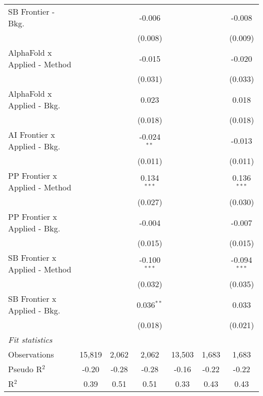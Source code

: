 \begin{tabular}{lcccccc}
   SB Frontier - Bkg.             &         &             & -0.006         &              &         & -0.008\\   
                                  &         &             & (0.008)        &              &         & (0.009)\\   
   AlphaFold x Applied - Method   &         &             & -0.015         &              &         & -0.020\\   
                                  &         &             & (0.031)        &              &         & (0.033)\\   
   AlphaFold x Applied - Bkg.     &         &             & 0.023          &              &         & 0.018\\   
                                  &         &             & (0.018)        &              &         & (0.018)\\   
   AI Frontier x Applied - Bkg.   &         &             & -0.024$^{**}$  &              &         & -0.013\\   
                                  &         &             & (0.011)        &              &         & (0.011)\\   
   PP Frontier x Applied - Method &         &             & 0.134$^{***}$  &              &         & 0.136$^{***}$\\   
                                  &         &             & (0.027)        &              &         & (0.030)\\   
   PP Frontier x Applied - Bkg.   &         &             & -0.004         &              &         & -0.007\\   
                                  &         &             & (0.015)        &              &         & (0.015)\\   
   SB Frontier x Applied - Method &         &             & -0.100$^{***}$ &              &         & -0.094$^{***}$\\   
                                  &         &             & (0.032)        &              &         & (0.035)\\   
   SB Frontier x Applied - Bkg.   &         &             & 0.036$^{**}$   &              &         & 0.033\\   
                                  &         &             & (0.018)        &              &         & (0.021)\\   
   \midrule
   \emph{Fit statistics}\\
   Observations                   & 15,819  & 2,062       & 2,062          & 13,503       & 1,683   & 1,683\\  
   Pseudo R$^2$                   & -0.20   & -0.28       & -0.28          & -0.16        & -0.22   & -0.22\\  
   R$^2$                          & 0.39    & 0.51        & 0.51           & 0.33         & 0.43    & 0.43\\  
   

\end{tabular}
